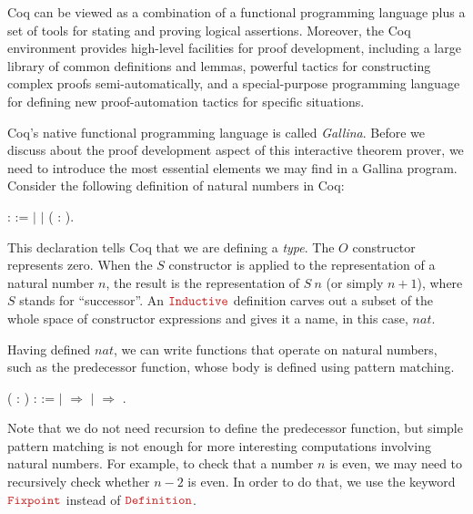 Coq can be viewed as a combination of a functional programming language plus a set of tools for stating and proving logical assertions. Moreover, the Coq environment provides high-level facilities for proof development, including a large library of common definitions and lemmas, powerful tactics for constructing complex proofs semi-automatically, and a special-purpose programming language for defining new proof-automation tactics for specific situations.

Coq's native functional programming language is called \emph{Gallina}. Before we discuss about the proof development aspect of this interactive theorem prover, we need to introduce the most essential elements we may find in a Gallina program. Consider the following definition of natural numbers in Coq:

\begin{coqdoccode}
	\coqdocnoindent
	  :  :=\coqdoceol
	\coqdocindent{1.00em}
	\ensuremath{|} \coqdoceol
	\coqdocindent{1.00em}
	\ensuremath{|}  ( : ).\coqdoceol
\end{coqdoccode}

This declaration tells Coq that we are defining a \emph{type}. The $ O $ constructor represents zero. When the $ S $ constructor is applied to the representation of a natural number $ n $, the result is the representation of $ S\ n $ (or simply $ n+1 $), where $ S $ stands for ``successor''. An $ \coqdockw{Inductive} $ definition carves out a subset of the whole space of constructor expressions and gives it a name, in this case, $ nat $.

Having defined $ nat $, we can write functions that operate on natural numbers, such as the predecessor function, whose body is defined using pattern matching.

\begin{coqdoccode}
	\coqdocnoindent
	  ( : ) :  :=\coqdoceol
	\coqdocindent{1.00em}
	  \coqdoceol
	\coqdocindent{2.00em}
	\ensuremath{|}  \ensuremath{\Rightarrow} \coqdoceol
	\coqdocindent{2.00em}
	\ensuremath{|}   \ensuremath{\Rightarrow} \coqdoceol
	\coqdocindent{1.00em}
	.\coqdoceol
\end{coqdoccode}

Note that we do not need recursion to define the predecessor function, but simple pattern matching is not enough for more interesting computations involving natural numbers. For example, to check that a number $ n $ is even, we may need to recursively check whether $ n-2 $ is even. In order to do that, we use the keyword $ \coqdockw{Fixpoint} $ instead of $ \coqdockw{Definition} $.


